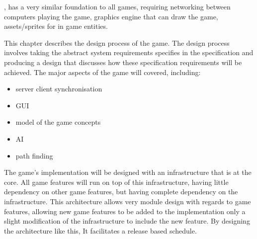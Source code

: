 
, has a very similar foundation to all games, requiring networking between computers playing the game, graphics engine that can draw the game, assets/sprites for in game entities.


This chapter describes the design process of the game.
The design process involves taking the abstract system requirements specifies in the specification and producing a design that discusses how these specification requirements will be achieved.
The major aspects of the game will covered, including:
\begin{itemize}
\item server client synchronisation
\item GUI
\item model of the game concepts
\item AI
\item path finding
\end{itemize}

%

The game's implementation will be designed with an infrastructure that is at the core. All game features will run on top of this infrastructure, having little dependency on other game features, but having complete dependency on the infrastructure. This architecture allows very module design with regards to game features, allowing new game features to be added to the implementation only a slight modification of the infrastructure to include the new feature. By designing the architecture like this, It facilitates a release based schedule.

